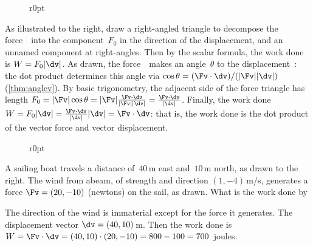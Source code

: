 \begin{figure}[4]r{0pt}\end{figure}
As illustrated to the right, draw a right-angled triangle to decompose the force~\Fv\ into the component~\(F_0\) in the direction of the displacement, and an unnamed component at right-angles.
Then by the scalar formula, the work done is \(W=F_0|\dv|\).
As drawn, the force~\Fv\ makes an angle~\(\theta\) to the displacement~\dv: the dot product determines this angle via \(\cos\theta=(\Fv\cdot\dv)/(|\Fv||\dv|)\)  (\cref{thm:anglev}).
By basic trigonometry, the adjacent side of the force triangle has length \(F_0=|\Fv|\cos\theta=|\Fv|\frac{\Fv\cdot\dv}{|\Fv||\dv|}=\frac{\Fv\cdot\dv}{|\dv|}\).
Finally, the work done \(W=F_0|\dv|=\frac{\Fv\cdot\dv}{|\dv|}|\dv|=\Fv\cdot\dv\): that is, the work done is the dot product of the vector force and vector displacement.
\par
\endgroup


\begin{figure}[6]r{0pt}
\end{figure}
\begin{example} 
A sailing boat travels a distance of~\(40\)\,m east and~\(10\)\,m north, as drawn to the right.
The wind from abeam, of strength and direction \((1,-4)\)\,m/s, generates a force \(\Fv=(20,-10)\) (newtons) on the sail, as drawn.
What is the work done by 

\begin{solution} 
The direction of the wind is immaterial except for the force it generates.
The displacement vector \(\dv=(40,10)\)\,m.
Then the work done is \(W=\Fv\cdot\dv =(40,10)\cdot(20,-10) =800-100 =700\)~joules. 
\end{solution}
\end{example}



